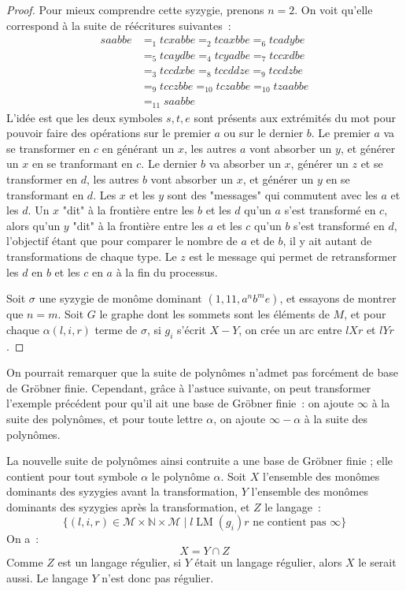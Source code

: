 \documentclass{article}
\newcommand{\N}{\mathbb{N}}
\newcommand{\M}{\mathcal{M}}
\DeclareMathOperator{\LM}{LM}
\begin{document}
\begin{proof}
Pour mieux comprendre cette syzygie, prenons $n = 2$. On voit qu'elle correspond à la suite de réécritures suivantes~:
\begin{align*}
saabbe & =_{1} tcxabbe =_{2} tcaxbbe =_{6} tcadybe \\
& =_{5} tcaydbe =_{4} tcyadbe =_{7} tccxdbe \\
& =_{3} tccdxbe =_{8} tccddze =_{9} tccdzbe \\
& =_{9} tcczbbe =_{10} tczabbe =_{10} tzaabbe \\
& =_{11} saabbe
\end{align*}
L'idée est que les deux symboles $s, t, e$ sont présents aux extrémités du mot pour pouvoir faire des opérations sur le premier $a$ ou sur le dernier $b$.
Le premier $a$ va se transformer en $c$ en générant un $x$, les autres $a$ vont absorber un $y$, et générer un $x$ en se tranformant en $c$.
Le dernier $b$ va absorber un $x$, générer un $z$ et se transformer en $d$, les autres $b$ vont absorber un $x$, et générer un $y$ en se transformant en $d$.
Les $x$ et les $y$ sont des "messages" qui commutent avec les $a$ et les $d$. Un $x$ "dit" à la frontière entre les $b$ et les $d$ qu'un $a$ s'est transformé en $c$, alors qu'un $y$ "dit" à la frontière entre les $a$ et les $c$ qu'un $b$ s'est transformé en $d$, l'objectif étant que pour comparer le nombre de $a$ et de $b$, il y ait autant de transformations de chaque type.
Le $z$ est le message qui permet de retransformer les $d$ en $b$ et les $c$ en $a$ à la fin du processus.

Soit $\sigma$ une syzygie de monôme dominant $(1, 11, a^{n}b^{m}e)$, et essayons de montrer que $n = m$.
Soit $G$ le graphe dont les sommets sont les éléments de $M$, et pour chaque $\alpha(l, i, r)$ terme de $\sigma$, si $g_i$ s'écrit $X - Y$, on crée un arc entre $lXr$ et $lYr$.
 

\end{proof}

On pourrait remarquer que la suite de polynômes n'admet pas forcément de base de Gröbner finie.
Cependant, grâce à l'astuce suivante, on peut transformer l'exemple précédent pour qu'il ait une base de Gröbner finie~: on ajoute $\infty$ à la suite des polynômes, et pour toute lettre $\alpha$, on ajoute $\infty - \alpha$ à la suite des polynômes.

La nouvelle suite de polynômes ainsi contruite a une base de Gröbner finie ; elle contient pour tout symbole $\alpha$ le polynôme $\alpha$.
Soit $X$ l'ensemble des monômes dominants des syzygies avant la transformation, $Y$ l'ensemble des monômes dominants des syzygies après la transformation, et $Z$ le langage~:
$$\{(l, i, r) \in \M \times \N \times \M \;|\; l \LM(g_i) r \mbox{ ne contient pas } \infty\}$$
On a~:
$$X = Y \cap Z$$
Comme $Z$ est un langage régulier, si $Y$ était un langage régulier, alors $X$ le serait aussi.
Le langage $Y$ n'est donc pas régulier.
\end{document}
